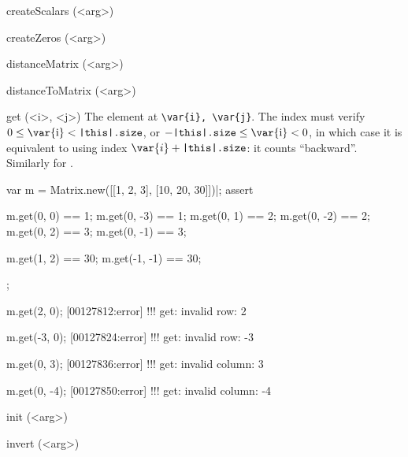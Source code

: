 \begin{urbiscriptapi}
\item[createScalars](<arg>)%
\begin{urbiassert}

\end{urbiassert}

\item[createZeros](<arg>)%
\begin{urbiassert}

\end{urbiassert}

\item[distanceMatrix](<arg>)%
\begin{urbiassert}

\end{urbiassert}

\item[distanceToMatrix](<arg>)%
\begin{urbiassert}

\end{urbiassert}

\item[get](<i>, <j>)%
  The element at \lstinline|\var{i}, \var{j}|. The index  must verify
  $0 \le \textrm{\var{i}} < \texttt{\this.size}$, or $-\texttt{\this.size}
  \le \textrm{\var{i}} < 0$, in which case it is equivalent to using index
  $\var{i} + \texttt{\this.size}$: it counts ``backward''.  Similarly for
  .
\begin{urbiscript}
var m = Matrix.new([[1, 2, 3], [10, 20, 30]])|;
assert
{
  m.get(0, 0) == 1;   m.get(0, -3) == 1;
  m.get(0, 1) == 2;   m.get(0, -2) == 2;
  m.get(0, 2) == 3;   m.get(0, -1) == 3;

  m.get(1, 2) == 30;  m.get(-1, -1) == 30;
};

m.get(2, 0);
[00127812:error] !!! get: invalid row: 2

m.get(-3, 0);
[00127824:error] !!! get: invalid row: -3

m.get(0, 3);
[00127836:error] !!! get: invalid column: 3

m.get(0, -4);
[00127850:error] !!! get: invalid column: -4
\end{urbiscript}

\item[init](<arg>)%
\begin{urbiassert}

\end{urbiassert}

\item[invert](<arg>)%
\begin{urbiassert}


\end{urbiassert}
\end{urbiscriptapi}
